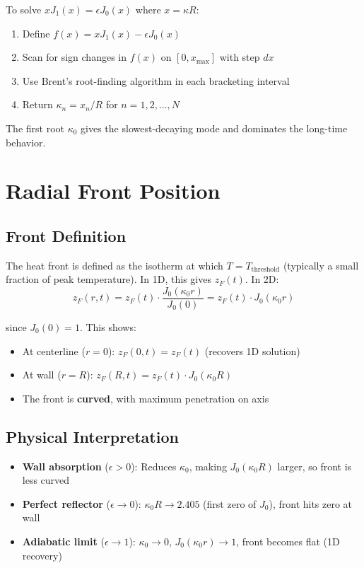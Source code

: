 \documentclass[12pt,a4paper]{article}
\begin{document}
To solve $x J_1(x) = \epsilon J_0(x)$ where $x = \kappa R$:

\begin{enumerate}
    \item Define $f(x) = x J_1(x) - \epsilon J_0(x)$
    \item Scan for sign changes in $f(x)$ on $[0, x_{\max}]$ with step $dx$
    \item Use Brent's root-finding algorithm in each bracketing interval
    \item Return $\kappa_n = x_n / R$ for $n=1,2,\ldots,N$
\end{enumerate}

The first root $\kappa_0$ gives the slowest-decaying mode and dominates the long-time behavior.

\section{Radial Front Position}

\subsection{Front Definition}

The heat front is defined as the isotherm at which $T = T_{\text{threshold}}$ (typically a small fraction of peak temperature). In 1D, this gives $z_F(t)$. In 2D:
\begin{equation}
z_F(r,t) = z_F(t) \cdot \frac{J_0(\kappa_0 r)}{J_0(0)} = z_F(t) \cdot J_0(\kappa_0 r)
\end{equation}

since $J_0(0) = 1$. This shows:
\begin{itemize}
    \item At centerline ($r=0$): $z_F(0,t) = z_F(t)$ (recovers 1D solution)
    \item At wall ($r=R$): $z_F(R,t) = z_F(t) \cdot J_0(\kappa_0 R)$
    \item The front is \textbf{curved}, with maximum penetration on axis
\end{itemize}

\subsection{Physical Interpretation}

\begin{itemize}
    \item \textbf{Wall absorption} ($\epsilon > 0$): Reduces $\kappa_0$, making $J_0(\kappa_0 R)$ larger, so front is less curved
    \item \textbf{Perfect reflector} ($\epsilon \to 0$): $\kappa_0 R \to 2.405$ (first zero of $J_0$), front hits zero at wall
    \item \textbf{Adiabatic limit} ($\epsilon \to 1$): $\kappa_0 \to 0$, $J_0(\kappa_0 r) \to 1$, front becomes flat (1D recovery)
\end{itemize}
\end{document}
